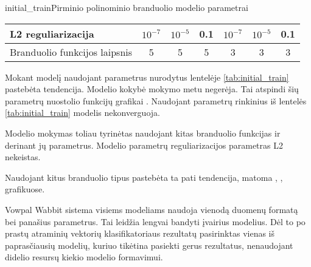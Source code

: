 \begin{ktutable}{initial_train}{Pirminio polinominio branduolio modelio parametrai}
    \begin{tabular}{| l | c | c | c | c | c | c | }
    \hline
        L2 reguliarizacija & $10^{-7}$ & $10^{-5}$ & 0.1 & $10^{-7}$ & $10^{-5}$ & 0.1 \\ \hline
        Branduolio funkcijos laipsnis & 5 & 5 & 5 & 3 & 3 & 3 \\ \hline
    \end{tabular}
\end{ktutable}

Mokant modelį naudojant parametrus nurodytus lentelėje \vref{tab:initial_train} pastebėta tendencija.
Modelio kokybė mokymo metu negerėja. Tai atspindi šių parametrų nuostolio funkcijų grafikai
. Naudojant parametrų rinkinius iš lentelės \vref{tab:initial_train}
modelis nekonverguoja.


Modelio mokymas toliau tyrinėtas naudojant kitas branduolio funkcijas ir derinant jų parametrus.
Modelio parametrų reguliarizacijos parametras L2 nekeistas.


Naudojant kitus branduolio tipus pastebėta ta pati tendencija, matoma , ,  grafikuose.


Vowpal Wabbit sistema visiems modeliams naudoja vienodą duomenų formatą bei panašius parametrus.
Tai leidžia lengvai bandyti įvairius modelius. Dėl to po prastų atraminių vektorių klasifikatoriaus rezultatų
pasirinktas vienas iš paprasčiausių modelių, kuriuo tikėtina pasiekti gerus rezultatus, nenaudojant
didelio resursų kiekio modelio formavimui.

